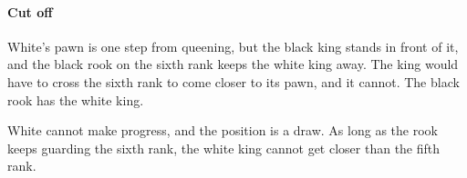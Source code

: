 \paragraph{Cut off}


White's pawn is one step from queening, but the black king stands in front of it, and the black
rook on the sixth rank keeps the white king away. The king would have to cross the sixth rank to
come closer to its pawn, and it cannot. The black rook has
the white king.

White cannot make progress, and the position is a draw. As long as the rook keeps guarding the
sixth rank, the white king cannot get closer than the fifth rank.

